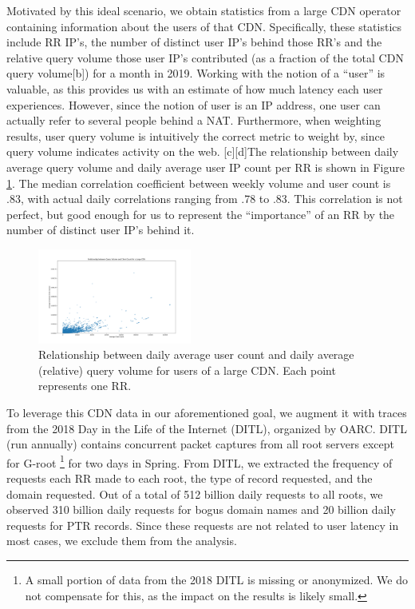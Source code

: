 \documentclass[sigconf,nonacm,10pt]{acmart}
\begin{document}
\label{sec:rr_global_look_data} Motivated by this ideal scenario, we
obtain statistics from a large CDN operator containing information about
the users of that CDN. Specifically, these statistics include RR IP's,
the number of distinct user IP's behind those RR's and the relative
query volume those user IP's contributed (as a fraction of the total CDN
query volume{[}b{]}) for a month in 2019. Working with the notion of a
``user'' is valuable, as this provides us with an estimate of how much
latency each user experiences. However, since the notion of user is an
IP address, one user can actually refer to several people behind a NAT.
Furthermore, when weighting results, user query volume is intuitively
the correct metric to weight by, since query volume indicates activity
on the web. {[}c{]}{[}d{]}The relationship between daily average query
volume and daily average user IP count per RR is shown in Figure
\ref{fig:query_user_relationship}. The median correlation coefficient
between weekly volume and user count is .83, with actual daily
correlations ranging from .78 to .83. This correlation is not perfect,
but good enough for us to represent the ``importance'' of an RR by the
number of distinct user IP's behind it.

\begin{figure}
    \centering
    \includegraphics[width=0.45\textwidth]{figures/query_user_relationship.png}
    \caption{Relationship between daily average user count and daily average (relative) query volume for users of a large CDN. Each point represents one RR.}
    \label{fig:query_user_relationship}
\end{figure}

To leverage this CDN data in our aforementioned goal, we augment it with
traces from the 2018 Day in the Life of the Internet (DITL), organized
by OARC. DITL (run annually) contains concurrent packet captures from
all root servers except for G-root
\footnote{ A small portion of data from the 2018 DITL is missing or anonymized. We do not compensate for this, as the impact on the results is likely small. }
for two days in Spring. From DITL, we extracted the frequency of
requests each RR made to each root, the type of record requested, and
the domain requested. \break
Out of a total of 512 billion daily requests to all roots, we observed
310 billion daily requests for bogus domain names and 20 billion daily
requests for PTR records. Since these requests are not related to user
latency in most cases, we exclude them from the analysis.
\end{document}

